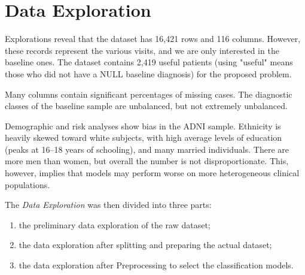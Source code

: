 \section{Data Exploration}
Explorations reveal that the dataset has 16,421 rows and 116 columns. However, these records represent the various visits, and we are only interested in the baseline ones. The dataset contains 2,419 useful patients (using "useful" means those who did not have a NULL baseline diagnosis) for the proposed problem.

Many columns contain significant percentages of missing cases. The diagnostic classes of the baseline sample are unbalanced, but not extremely unbalanced.

Demographic and risk analyses show bias in the ADNI sample. Ethnicity is heavily skewed toward white subjects, with high average levels of education (peaks at 16–18 years of schooling), and many married individuals. There are more men than women, but overall the number is not disproportionate. This, however, implies that models may perform worse on more heterogeneous clinical populations. 

The \textit{Data Exploration} was then divided into three parts: 
\begin{enumerate}
	\item the preliminary data exploration of the raw dataset;
	\item the data exploration after splitting and preparing the actual dataset;
	\item the data exploration after Preprocessing to select the classification models.
\end{enumerate}



